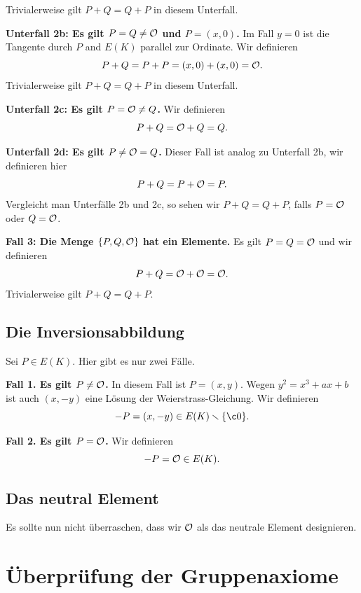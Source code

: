 Trivialerweise gilt $P+Q=Q+P$ in diesem Unterfall.

\textbf{Unterfall 2b: Es gilt $P=Q\not={\mathcal O}$ und $P=(x,0)$.}
Im Fall $y=0$ ist die Tangente durch $P$ and $E(K)$ parallel zur
Ordinate. Wir 
definieren
\begin{equation*}
  P+Q = P+P = (x,0)+(x,0) = {\mathcal O}. 
\end{equation*}
Trivialerweise gilt $P+Q=Q+P$ in diesem Unterfall.

\textbf{Unterfall 2c: Es gilt $P={\mathcal O}\not=Q$.}
Wir definieren 
\begin{equation*}
  P+Q = {\mathcal O} + Q = Q. 
\end{equation*}


\textbf{Unterfall 2d: Es gilt $P\not={\mathcal O}=Q$.}
Dieser Fall ist analog zu Unterfall 2b, wir definieren hier
\begin{equation*}
  P+Q = P+{\mathcal O} = P. 
\end{equation*}
Vergleicht man Unterfälle 2b und 2c, so sehen wir $P+Q=Q+P$, falls
$P={\mathcal O}$ oder $Q={\mathcal O}$. 


\medskip
\textbf{Fall 3: Die Menge $\{P,Q,{\mathcal O}\}$ hat ein Elemente.} Es gilt
$P=Q={\mathcal O}$ und wir definieren
\begin{equation*}
  P+Q = {\mathcal O}+{\mathcal O} = {\mathcal O}. 
\end{equation*}
Trivialerweise gilt $P+Q=Q+P$. 

\subsection{Die Inversionsabbildung}

Sei $P\in E(K)$. Hier gibt es nur zwei Fälle.

\textbf{Fall 1. Es gilt $P\not={\mathcal O}$.} In diesem Fall ist $P=(x,y)$.
Wegen $y^2 = x^3+ax+b$ ist auch $(x,-y)$ eine Lösung der Weierstrass-Gleichung.
Wir  definieren
$$
-P = (x,-y)\in E(K)\ssm\{\c0\}.
$$

\textbf{Fall 2. Es gilt $P={\mathcal O}$.} 
Wir  definieren
$$
-P = {\mathcal O} \in E(K).
$$

\subsection{Das neutral Element}
Es sollte nun nicht überraschen, dass wir ${\mathcal O}$ als das neutrale
Element designieren.

\section{Überprüfung der Gruppenaxiome}

